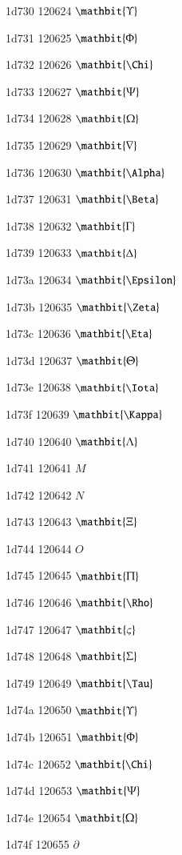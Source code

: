 \documentclass[11pt]{article}
\begin{document}
1d730 120624 \ensuremath{\mathbit{\Upsilon}}

1d731 120625 \ensuremath{\mathbit{\Phi}}

1d732 120626 \ensuremath{\mathbit{\Chi}}

1d733 120627 \ensuremath{\mathbit{\Psi}}

1d734 120628 \ensuremath{\mathbit{\Omega}}

1d735 120629 \ensuremath{\mathbit{\nabla}}

1d736 120630 \ensuremath{\mathbit{\Alpha}}

1d737 120631 \ensuremath{\mathbit{\Beta}}

1d738 120632 \ensuremath{\mathbit{\Gamma}}

1d739 120633 \ensuremath{\mathbit{\Delta}}

1d73a 120634 \ensuremath{\mathbit{\Epsilon}}

1d73b 120635 \ensuremath{\mathbit{\Zeta}}

1d73c 120636 \ensuremath{\mathbit{\Eta}}

1d73d 120637 \ensuremath{\mathbit{\Theta}}

1d73e 120638 \ensuremath{\mathbit{\Iota}}

1d73f 120639 \ensuremath{\mathbit{\Kappa}}

1d740 120640 \ensuremath{\mathbit{\Lambda}}

1d741 120641 \ensuremath{M}

1d742 120642 \ensuremath{N}

1d743 120643 \ensuremath{\mathbit{\Xi}}

1d744 120644 \ensuremath{O}

1d745 120645 \ensuremath{\mathbit{\Pi}}

1d746 120646 \ensuremath{\mathbit{\Rho}}

1d747 120647 \ensuremath{\mathbit{\varsigma}}

1d748 120648 \ensuremath{\mathbit{\Sigma}}

1d749 120649 \ensuremath{\mathbit{\Tau}}

1d74a 120650 \ensuremath{\mathbit{\Upsilon}}

1d74b 120651 \ensuremath{\mathbit{\Phi}}

1d74c 120652 \ensuremath{\mathbit{\Chi}}

1d74d 120653 \ensuremath{\mathbit{\Psi}}

1d74e 120654 \ensuremath{\mathbit{\Omega}}

1d74f 120655 \ensuremath{\partial}
\end{document}
